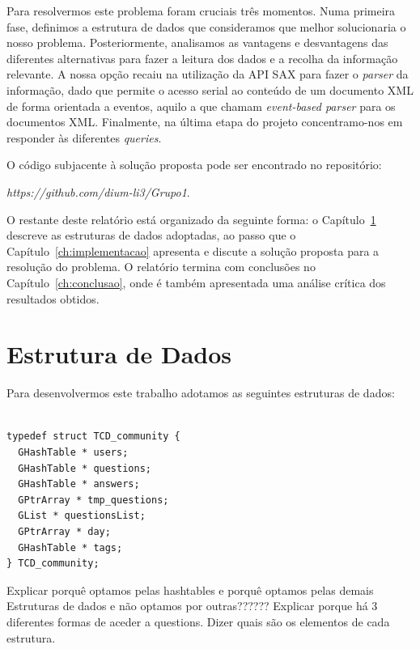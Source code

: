 \documentclass[a4paper]{report}
\begin{document}
Para resolvermos este problema foram cruciais três momentos. Numa primeira fase,
definimos a estrutura de dados que consideramos que melhor solucionaria o nosso
problema. Posteriormente, analisamos as vantagens e desvantagens das diferentes
alternativas para fazer a leitura dos dados e a recolha da informação relevante.
A nossa opção recaiu na utilização da API SAX para fazer o \textit{parser} da
informação, dado que permite o acesso serial ao conteúdo de um documento XML de
forma orientada a eventos, aquilo a que chamam \textit{event-based parser} para
os documentos XML.
Finalmente, na última etapa do projeto concentramo-nos em responder
às diferentes \textit{queries}.

O código subjacente à solução proposta pode ser encontrado no repositório:

\begin{center}
\emph{https://github.com/dium-li3/Grupo1}.
\end{center}

O restante deste relatório está organizado da seguinte forma: o
Capítulo~\ref{ch:estruturadedados} descreve as estruturas de dados adoptadas,
ao passo que o Capítulo~\ref{ch:implementacao}  apresenta e discute a solução
proposta para a resolução do problema. O relatório termina com conclusões no
Capítulo~\ref{ch:conclusao}, onde é também apresentada uma análise crítica dos
resultados obtidos.



\chapter{Estrutura de Dados}
\label{ch:estruturadedados}

Para desenvolvermos este trabalho adotamos as seguintes estruturas de dados:

\begin{verbatim}

typedef struct TCD_community {
  GHashTable * users;
  GHashTable * questions;
  GHashTable * answers;
  GPtrArray * tmp_questions;
  GList * questionsList;
  GPtrArray * day;
  GHashTable * tags;
} TCD_community;

\end{verbatim}

Explicar porquê optamos pelas hashtables e porquê optamos pelas demais Estruturas
de dados e não optamos por outras??????
Explicar porque há 3 diferentes formas de aceder a questions.
Dizer quais são os elementos de cada estrutura.
\end{document}
